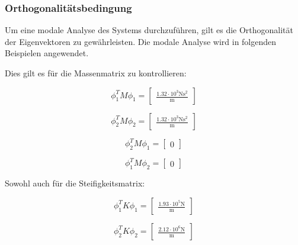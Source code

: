 \documentclass[
  letterpaper,
  DIV=11]{scrreprt}
\begin{document}
\hypertarget{sec-mms_nach_ortho}{%
\subsubsection{Orthogonalitätsbedingung}\label{sec-mms_nach_ortho}}

Um eine modale Analyse des Systems durchzuführen, gilt es die
Orthogonalität der Eigenvektoren zu gewährleisten. Die modale Analyse
wird in folgenden Beispielen angewendet.

Dies gilt es für die Massenmatrix zu kontrollieren:

\begin{equation}\phi_{1}^{T} M \phi_{1} = \left[\begin{matrix}\frac{1.32 \cdot 10^{3} \text{N} \text{s}^{2}}{\text{m}}\end{matrix}\right]\end{equation}

\begin{equation}\phi_{2}^{T} M \phi_{2} = \left[\begin{matrix}\frac{1.32 \cdot 10^{3} \text{N} \text{s}^{2}}{\text{m}}\end{matrix}\right]\end{equation}

\begin{equation}\phi_{2}^{T} M \phi_{1} = \left[\begin{matrix}0\end{matrix}\right]\end{equation}

\begin{equation}\phi_{1}^{T} M \phi_{2} = \left[\begin{matrix}0\end{matrix}\right]\end{equation}

Sowohl auch für die Steifigkeitsmatrix:

\begin{equation}\phi_{1}^{T} K \phi_{1} = \left[\begin{matrix}\frac{1.93 \cdot 10^{5} \text{N}}{\text{m}}\end{matrix}\right]\end{equation}

\begin{equation}\phi_{2}^{T} K \phi_{2} = \left[\begin{matrix}\frac{2.12 \cdot 10^{6} \text{N}}{\text{m}}\end{matrix}\right]\end{equation}
\end{document}
